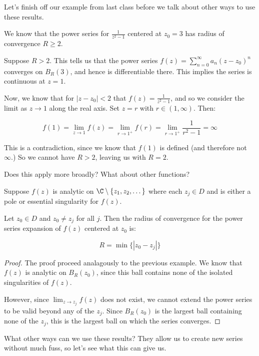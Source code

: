 Let's finish off our example from last class before we talk about other ways to use these results.

\begin{ex}{}{} We know that the power series for $\frac{1}{z^2 - 1}$ centered at $z_0 = 3$ has radius of convergence $R \ge 2$.

Suppose $R> 2$. This tells us that the power series $f(z) = \sum_{n = 0}^\infty a_n(z-z_0)^n$ converges on $B_R(3)$, and hence is differentiable there. This implies the series is continuous at $z = 1$.

Now, we know that for $|z-z_0| < 2$ that $f(z) = \frac{1}{z^2 - 1}$, and so we consider the limit as $z\rightarrow 1$ along the real axis. Set $z = r$ with $r\in(1,\infty)$. Then:

$$f(1) = \lim_{z\rightarrow 1} f(z) = \lim_{r\rightarrow 1^+} f(r) = \lim_{r\rightarrow 1^+} \frac{1}{r^2 - 1} = \infty$$

This is a contradiction, since we know that $f(1)$ is defined (and therefore not $\infty$.) So we cannot have $R > 2$, leaving us with $R = 2$.
\end{ex}

Does this apply more broadly? What about other functions?

\begin{thmbo}{}{} Suppose $f(z)$ is analytic on $\C\setminus\{z_1,z_2,\dots\}$ where each $z_j\in D$ and is either a pole or essential singularity for $f(z)$.

Let $z_0\in D$ and $z_0\ne z_j$ for all $j$. Then the radius of convergence for the power series expansion of $f(z)$ centered at $z_0$ is:

$$R = \min\{|z_0-z_j|\}$$
\end{thmbo}

\begin{proof} The proof proceed analagously to the previous example. We know that $f(z)$ is analytic on $B_R(z_0)$, since this ball contains none of the isolated singularities of $f(z)$.

However, since $\lim_{z\rightarrow z_j} f(z)$ does not exist, we cannot extend the power series to be valid beyond any of the $z_j$. Since $B_R(z_0)$ is the largest ball containing none of the $z_j$, this is the largest ball on which the series converges.
\end{proof}

What other ways can we use these results? They allow us to create new series without much fuss, so let's see what this can give us.

